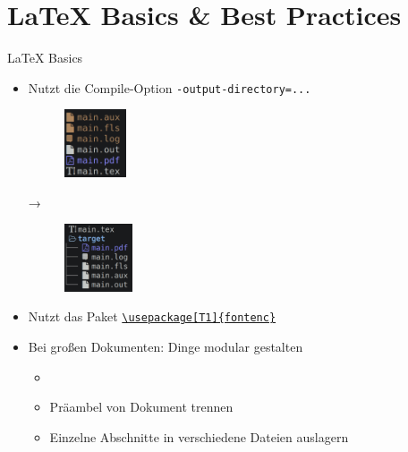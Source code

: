 \documentclass[main.tex]{subfiles}
\begin{document}
\section{\LaTeX{} Basics \& Best Practices}

\begin{frame}[fragile]{\LaTeX{} Basics}
    \begin{itemize}
        \item Nutzt die Compile-Option \texttt{-output-directory=...}
        \pause
        \bigskip
        \begin{center}
            \begin{minipage}{0.33\textwidth}
                \begin{figure}[H]
                    \centering
                    \includegraphics[height=2cm]{images/CompileOutput}
                    \label{fig:CompileOutput}
                \end{figure}
            \end{minipage}
            \begin{minipage}{0.055\textwidth}
                →
            \end{minipage}
            \begin{minipage}{0.33\textwidth}
                \begin{figure}[H]
                    \centering
                    \includegraphics[height=2cm]{images/CompileOutputWithTarget}
                    \label{fig:CompileOutputWithTarget}
                \end{figure}
            \end{minipage}
        \end{center}
        \pause

        \bigskip
        \item Nutzt das Paket \texttt{\href{https://tex.stackexchange.com/a/677}{\textbackslash usepackage[T1]\{fontenc\}}}
        \pause
        \medskip
        \item Bei großen Dokumenten: Dinge modular gestalten
        \begin{itemize}
            \item \verb||
            \item Präambel von Dokument trennen
            \item Einzelne Abschnitte in verschiedene Dateien auslagern
        \end{itemize}

    \end{itemize}
\end{frame}
\end{document}
